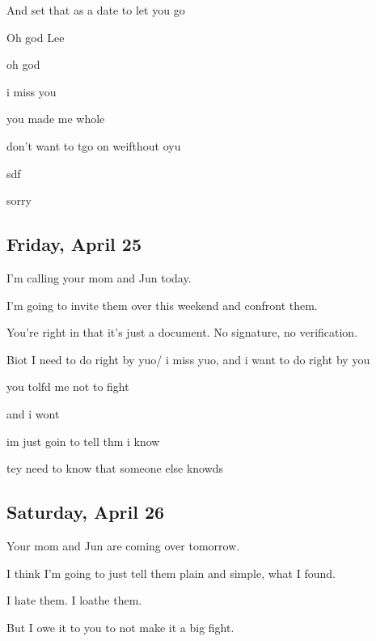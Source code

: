 {
And set that as a date to let you go

Oh god Lee

oh god

i miss you

you made me whole

don't want to tgo on weifthout oyu

sdf

sorry

\newpage

\subsection*{Friday, April 25}\label{friday-april-25}

I'm calling your mom and Jun today.

I'm going to invite them over this
weekend and confront them.

You're right in that it's just a
document. No signature, no verification.

Biot I need to do right by yuo/ i
miss yuo, and i want to do right by you

you tolfd me not to fight

and i wont

im just goin to tell thm i know

tey need to know that someone else
knowds

\newpage

\subsection*{Saturday, April 26}\label{saturday-april-26}

Your mom and Jun are coming over
tomorrow.

I think I'm going to just tell them
plain and simple, what I found.

I hate them. I loathe them.

But I owe it to you to not make it
a big fight.

}
